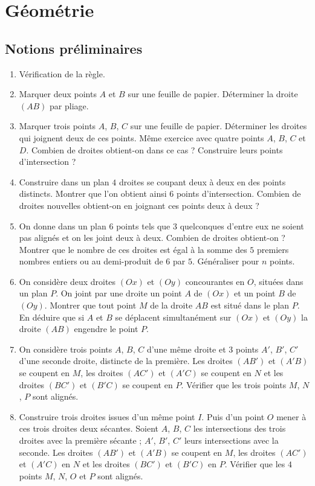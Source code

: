 \documentclass[12 pt]{report}
\theoremstyle{plain}
\newcounter{n}
\begin{document}
 
 \part{Géométrie}
\chapter{Notions préliminaires} 
\begin{enumerate}
\item Vérification de la règle. 
\item Marquer deux points $A$ et $B$ sur une feuille de papier. Déterminer la droite $(AB)$ par pliage. 
\item Marquer trois points $A$, $B$, $C$ sur une feuille de papier. Déterminer les droites qui joignent deux de ces points. 
Même exercice avec quatre points $A$, $B$, $C$ et $D$. Combien de droites obtient-on dans ce cas ? Construire leurs points d'intersection ? 
\item Construire dans un plan $4$ droites se coupant deux à deux en des points distincts. Montrer que l'on obtient ainsi $6$ points d'intersection. Combien de droites nouvelles obtient-on en joignant ces points deux à deux ? 
\item On donne dans un plan $6$ points tels que $3$ quelconques d'entre eux ne soient pas alignés et on les joint deux à deux. Combien de droites obtient-on ? Montrer que le nombre de ces droites est égal à la somme des $5$ premiers nombres entiers ou au demi-produit de $6$ par $5$. Généraliser pour $n$ points. 
\item On considère deux droites $(Ox)$ et $(Oy)$ concourantes en $O$, situées dans un plan $P$. On joint par une droite un point $A$ de $(Ox)$ et un point $B$ de $(Oy)$. Montrer que tout point $M$ de la droite $AB$ est situé dans le plan $P$.\\ En déduire que si $A$ et $B$ se 
déplacent simultanément sur $(Ox)$ et $(Oy)$ la droite $(AB)$ engendre le point $P$.
\item On considère trois points $A$, $B$, $C$ d'une même droite et $3$ points $A'$, $B'$, $C'$ d'une seconde droite, distincte de la première. Les droites $(AB')$ et $(A'B)$ se coupent en $M$, les droites $(AC')$ et $(A'C)$ se coupent en $N$ et les droites $(BC')$ et $(B'C)$ se coupent en $P$. Vérifier que les trois points $M$, $N$, $P$ sont alignés.
\item Construire trois droites issues d'un même point $I$. Puis d'un point $O$ mener à ces trois droites deux sécantes. Soient $A$, $B$, $C$
les intersections des trois droites avec la première sécante ; $A'$, $B'$, $C'$ leurs intersections avec la seconde. Les droites $(AB')$ et 
$(A'B)$ se coupent en $M$, les droites $(AC')$ et $(A'C)$ en $N$ et les
droites $(BC')$ et $(B'C)$ en $P$. Vérifier que les $4$ points $M$, $N$, $O$ et $P$ sont alignés. 
\end{enumerate}
\end{document}
